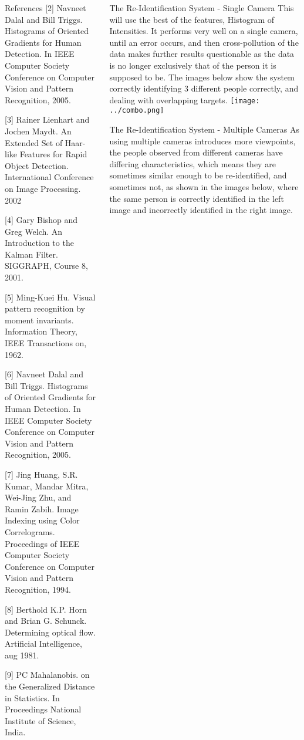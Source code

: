\documentclass[final]{beamer}
\begin{document}
\begin{frame}{}
\begin{columns}[t]
\begin{column}{.49\linewidth}
\begin{block}{References}
[2] Navneet Dalal and Bill Triggs. Histograms of Oriented Gradients for Human Detection. In IEEE Computer Society Conference on Computer Vision and Pattern Recognition, 2005.
        
[3] Rainer Lienhart and Jochen Maydt. An Extended Set of Haar-like Features for Rapid Object Detection. International Conference on Image Processing. 2002
            
[4] Gary Bishop and Greg Welch. An Introduction to the Kalman Filter. SIGGRAPH, Course 8, 2001.
                
[5] Ming-Kuei Hu. Visual pattern recognition by moment invariants. Information Theory, IEEE Transactions on, 1962.
                 
[6] Navneet Dalal and Bill Triggs. Histograms of Oriented Gradients for Human Detection. In IEEE Computer Society Conference on Computer Vision and Pattern Recognition, 2005.
                  
[7] Jing Huang, S.R. Kumar, Mandar Mitra, Wei-Jing Zhu, and Ramin Zabih. Image Indexing using Color Correlograms. Proceedings of IEEE Computer Society Conference on Computer Vision and Pattern Recognition, 1994.
                   
[8] Berthold K.P. Horn and Brian G. Schunck. Determining optical flow. Artificial Intelligence, aug 1981.
                   
[9] PC Mahalanobis. on the Generalized Distance in Statistics. In Proceedings National Institute of Science, India.
    \end{block}
        
	 \end{column}
	 \begin{column}{.49\linewidth}
 		\begin{block}{The Re-Identification System - Single Camera}
 		\justify This will use the best of the features, Histogram of Intensities. It performs very well on a single camera, until an error occurs, and then cross-pollution of the data makes further results questionable as the data is no longer exclusively that of the person it is supposed to be. 
 		The images below show the system correctly identifying 3 different people correctly, and dealing with overlapping targets. 
 		\justify
 		\texttt{[image: ../combo.png]}  
         
        \end{block}
        
        \begin{block}{The Re-Identification System - Multiple Cameras}
        \justify
        As using multiple cameras introduces more viewpoints, the people observed from different cameras have differing characteristics, which means they are sometimes similar enough to be re-identified, and sometimes not, as shown in the images below, where the same person is correctly identified in the left image and incorrectly identified in the right image. 	
        	 

\end{block}
\end{column}
\end{columns}
\end{frame}
\end{document}

